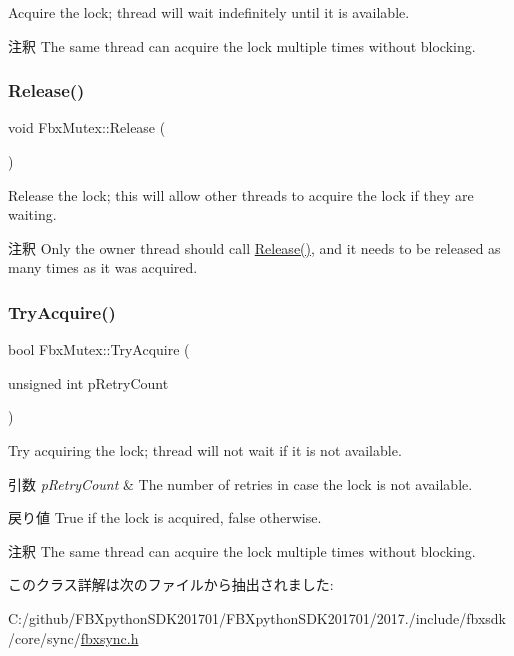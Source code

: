 Acquire the lock; thread will wait indefinitely until it is available. \begin{DoxyRemark}{注釈}
The same thread can acquire the lock multiple times without blocking. 
\end{DoxyRemark}
\mbox{\label{class_fbx_mutex_af64f050aba0c86a19c75c8fc236325d1}} 
\subsubsection{\texorpdfstring{Release()}{Release()}}
{\footnotesize\ttfamily void Fbx\+Mutex\+::\+Release (\begin{DoxyParamCaption}{ }\end{DoxyParamCaption})}

Release the lock; this will allow other threads to acquire the lock if they are waiting. \begin{DoxyRemark}{注釈}
Only the owner thread should call \hyperlink{class_fbx_mutex_af64f050aba0c86a19c75c8fc236325d1}{Release()}, and it needs to be released as many times as it was acquired. 
\end{DoxyRemark}
\mbox{\label{class_fbx_mutex_ace271bd592e917dffdc850b74482d52f}} 
\subsubsection{\texorpdfstring{Try\+Acquire()}{TryAcquire()}}
{\footnotesize\ttfamily bool Fbx\+Mutex\+::\+Try\+Acquire (\begin{DoxyParamCaption}\item[{unsigned int}]{p\+Retry\+Count }\end{DoxyParamCaption})}

Try acquiring the lock; thread will not wait if it is not available. 
\begin{DoxyParams}{引数}
{\em p\+Retry\+Count} & The number of retries in case the lock is not available. \\
\hline
\end{DoxyParams}
\begin{DoxyReturn}{戻り値}
True if the lock is acquired, false otherwise. 
\end{DoxyReturn}
\begin{DoxyRemark}{注釈}
The same thread can acquire the lock multiple times without blocking. 
\end{DoxyRemark}


このクラス詳解は次のファイルから抽出されました\+:\begin{DoxyCompactItemize}
\item 
C\+:/github/\+F\+B\+Xpython\+S\+D\+K201701/\+F\+B\+Xpython\+S\+D\+K201701/2017./include/fbxsdk/core/sync/\hyperlink{fbxsync_8h}{fbxsync.\+h}\end{DoxyCompactItemize}
